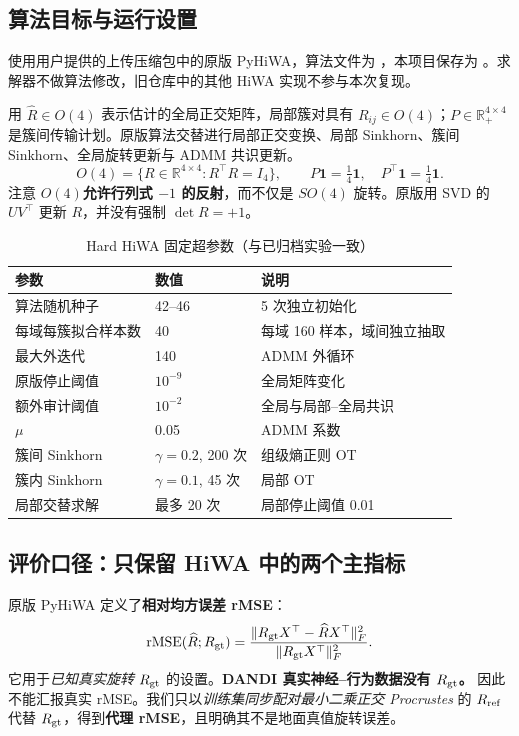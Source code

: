 \documentclass[UTF8,zihao=-4,a4paper]{ctexart}
\newcommand{\R}{\mathbb{R}}
\begin{document}
\subsection{算法目标与运行设置}
使用用户提供的上传压缩包中的原版 PyHiWA，算法文件为 ，本项目保存为 。求解器不做算法修改，旧仓库中的其他 HiWA 实现不参与本次复现。

用 $\widehat R\in O(4)$ 表示估计的全局正交矩阵，局部簇对具有 $R_{ij}\in O(4)$；$P\in\R_+^{4\times4}$ 是簇间传输计划。原版算法交替进行局部正交变换、局部 Sinkhorn、簇间 Sinkhorn、全局旋转更新与 ADMM 共识更新。
\begin{equation}
 O(4)=\{R\in\R^{4\times4}:R^\top R=I_4\},\qquad
 P\mathbf1=\tfrac14\mathbf1,\quad P^\top\mathbf1=\tfrac14\mathbf1.
\end{equation}
注意 $O(4)$\textbf{允许行列式 $-1$ 的反射}，而不仅是 $SO(4)$ 旋转。原版用 SVD 的 $UV^\top$ 更新 $R$，并没有强制 $\det R=+1$。

\begin{table}[H]\centering\small
\caption{Hard HiWA 固定超参数（与已归档实验一致）}\label{tab:parameters}
\begin{tabular}{@{}lll@{}}\toprule
参数 & 数值 & 说明\\\midrule
算法随机种子 & 42--46 & 5 次独立初始化\\
每域每簇拟合样本数 & 40 & 每域 160 样本，域间独立抽取\\
最大外迭代 & 140 & ADMM 外循环\\
原版停止阈值 & $10^{-9}$ & 全局矩阵变化\\
额外审计阈值 & $10^{-2}$ & 全局与局部--全局共识\\
$\mu$ & 0.05 & ADMM 系数\\
簇间 Sinkhorn & $\gamma=0.2$, 200 次 & 组级熵正则 OT\\
簇内 Sinkhorn & $\gamma=0.1$, 45 次 & 局部 OT\\
局部交替求解 & 最多 20 次 & 局部停止阈值 0.01\\\bottomrule
\end{tabular}
\end{table}

\subsection{评价口径：只保留 HiWA 中的两个主指标}
原版 PyHiWA 定义了\textbf{相对均方误差 rMSE}：
\begin{equation}\label{eq:rmse}
\mathrm{rMSE}(\widehat R;R_{\rm gt})=
\frac{\|R_{\rm gt}X^\top-\widehat R X^\top\|_F^2}
{\|R_{\rm gt}X^\top\|_F^2}.
\end{equation}
它用于\emph{已知真实旋转} $R_{\rm gt}$ 的设置。\textbf{DANDI 真实神经--行为数据没有 $R_{\rm gt}$。} 因此不能汇报真实 rMSE。我们只以\emph{训练集同步配对最小二乘正交 Procrustes} 的 $R_{\rm ref}$ 代替 $R_{\rm gt}$，得到\textbf{代理 rMSE}，且明确其不是地面真值旋转误差。
\end{document}
